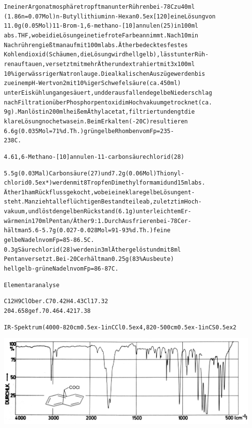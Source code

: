 \documentclass[a4paper,11pt]{article}
\begin{document}
\begin{alltt}
In einer Argonatmosphäre tropft man unter Rühren bei -78\degree{}C zu 40 ml
(1.86 n = 0.07 Mol) n-Butyllithium in n-Hexan \raise0.5ex\hbox{[120]} eine Lösung von
11.0 g (0.05 Mol) 11-Brom-1‚6-methano-[10]annulen (25) in 100 ml
abs. THF, wobei die Lösung eine tiefrote Farbe annimmt. Nach 10 min
Nachrühren gießt man auf mit 100 ml abs. Äther bedecktes festes
Kohlendioxid (Schäumen, die Lösung wird hellgelb), lässt unter Rüh-
ren auftauen, versetzt mit mehr Äther und extrahiert mit 3 x 100 ml
10 \%iger wässriger Natronlauge. Die alkalischen Auszüge werden bis
zu einem pH-Wert von 2 mit 10 \%iger Schwefelsäure (ca. 450 ml)
unter Eiskühlung angesäuert, und der ausfallende gelbe Niederschlag
nach Filtration über Phosphorpentoxid im Hochvakuum getrocknet (ca.
9 g). Man löst in 200 ml heißem Äthylacetat, filtriert und engt die
klare Lösung noch etwas ein. Beim Erkalten (-20\degree{}C) resultieren
6.6 g (0.035 Mol = 71 \% d.Th.) grüngelbe Rhomben vom Fp = 235 -
238\degree{}C.

 
\newpage
{}


4.6 1‚6-Methano-[10]annulen-11-carbonsäurechlorid (28)

5.5 g (0.03 Mal) Carbonsäure (27) und 7.2 g (0.06 Mol) Thionyl-
chlorid \leavevmode\raise0.5ex\hbox{*}) werden mit 8 Tropfen Dimethylformamid und 15 ml abs.
Äther 1 h am Rückfluss gekocht, wobei eine klare gelbe Lösung ent-
steht. Man zieht alle flüchtigen Bestandteile ab, zuletzt im Hoch-
vakuum, und löst den gelben Rückstand (6.1 g) unter leichtem Er-
wärmen in 170 ml Pentan/Äther 9:1. Durch Ausfrieren bei -78\degree{}C er-
hält man 5.6 - 5.7 g (0.027 - 0.028 Mol = 91 - 93 \% d.Th.) feine
gelbe Nadeln vom Fp = 85 - 86.5\degree{}C.
0.3 g Säurechlorid (28) werden in 3 ml Äther gelöst und mit 8 ml
Pentan versetzt. Bei -20\degree{}C erhält man 0.25 g (83 \% Ausbeute)
hellgelb-grüne Nadeln vom Fp = 86 - 87\degree{}C.

Elementaranalyse

C12H9ClO  ber. C  70.42  H  4.43   Cl  17.32
204.658   gef.    70.46     4.42       17.38

IR-Spektrum (4000-820 cm\raise0.5ex\hbox{-1} in CCl\lower0.5ex\hbox{4}, 820-500 cm\raise0.5ex\hbox{-1} in CS\lower0.5ex\hbox{2}
\end{alltt}
\hspace*{-0.5cm}\includegraphics[width=14.94cm]{IR_033}
\end{document}
